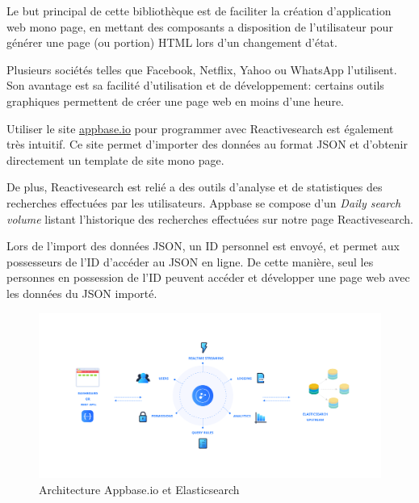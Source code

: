 Le but principal de cette bibliothèque est de faciliter la création d’application web mono page, en mettant des composants a disposition de l'utilisateur pour générer une page (ou portion) HTML lors d'un changement d'état.

Plusieurs sociétés telles que Facebook, Netflix, Yahoo ou WhatsApp l’utilisent.
Son avantage est sa facilité d'utilisation et de développement: certains outils graphiques permettent de créer une page web en moins d'une heure.

Utiliser le site \href{https://appbase.io/}{appbase.io} pour programmer avec Reactivesearch est également très intuitif.
Ce site permet d’importer des données au format JSON et d'obtenir directement un template de site mono page\@.

De plus, Reactivesearch est relié a des outils d'analyse et de statistiques des recherches effectuées par les utilisateurs.
Appbase se compose d’un \textit{Daily search volume} listant l’historique des recherches effectuées sur notre page Reactivesearch. 

Lors de l’import des données JSON, un ID personnel est envoyé, et permet aux possesseurs de l'ID d’accéder au JSON en ligne.
De cette manière, seul les personnes en possession de l'ID peuvent accéder et développer une page web avec les données du JSON importé. 

\begin{figure}[h!]
  \centering
  \includegraphics[width=\textwidth]{images/ArchitectureElasticsearchAppbase.png}
	\caption[]{Architecture Appbase.io et Elasticsearch}
	\label{archi_appbase}
\end{figure}

